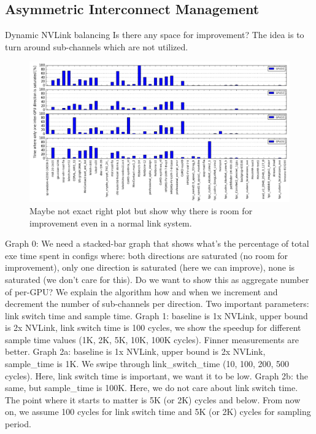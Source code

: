 \subsection{Asymmetric Interconnect Management}
\label{interconnect}

Dynamic NVLink balancing Is there any space for improvement? The idea is to turn around sub-channels which are not utilized. 

\begin{figure}[tp]
    \centering
    \includegraphics[width=0.9\columnwidth]{figures/link-motivation.jpg}
    \caption{Maybe not exact right plot but show why there is room for improvement even in a normal link system.}
    \label{fig:link-motivation}
\end{figure}

Graph 0: We need a stacked-bar graph that shows what’s the percentage of total exe time spent in configs where: both directions are saturated (no room for improvement), only one direction is saturated (here we can improve), none is saturated (we don’t care for this). Do we want to show this as aggregate number of per-GPU?
We explain the algorithm how and when we increment and decrement the number of sub-channels per direction. Two important parameters: link switch time and sample time.
Graph 1: baseline is 1x NVLink, upper bound is 2x NVLink, link switch time is 100 cycles, we show the speedup for different sample time values (1K, 2K, 5K, 10K, 100K cycles). Finner measurements are better.
Graph 2a: baseline is 1x NVLink, upper bound is 2x NVLink, sample\_time is 1K. We swipe through link\_switch\_time (10, 100, 200, 500 cycles). Here, link switch time is important, we want it to be low.
Graph 2b: the same, but sample\_time is 100K. Here, we do not care about link switch time. The point where it starts to matter is 5K (or 2K) cycles and below. From now on, we assume 100 cycles for link switch time and 5K (or 2K) cycles for sampling period.


